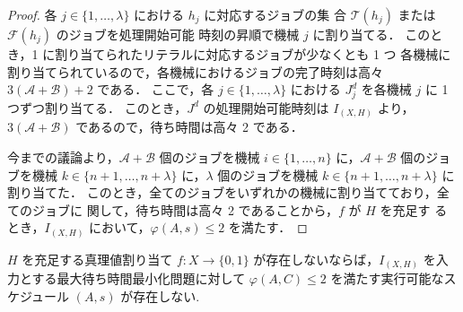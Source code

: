\documentclass[12pt]{optlab-bachelor}
\begin{document}
\begin{proof}
  各 $j \in \{1, \ldots, \lambda \}$ における $h_j$ に対応するジョブの集
  合 $\mathcal{T}(h_j)$ または $\mathcal{F}(h_j)$ のジョブを処理開始可能
  時刻の昇順で機械 $j$ に割り当てる．
  このとき，1 に割り当てられたリテラルに対応するジョブが少なくとも 1 つ
  各機械に割り当てられているので，各機械におけるジョブの完了時刻は高々
  $3(\mathcal{A} + \mathcal{B}) + 2$ である．
  ここで，各 $j \in \{1,\ldots,\lambda\}$ における $J^d_j$ を各機械 $j$
  に 1 つずつ割り当てる．
  このとき，$J^d$ の処理開始可能時刻は $I_{(X,H)}$ より，$3(\mathcal{A}
  + \mathcal{B})$ であるので，待ち時間は高々 2 である．

  今までの議論より，$\mathcal{A} + \mathcal{B}$ 個のジョブを機械 $i \in
  \{1,\ldots,n\}$ に，$\mathcal{A} + \mathcal{B}$ 個のジョブを機械 $k \in\{n + 1, \ldots, n + \lambda\}$ に，$\lambda$ 個のジョブを機械 $k \in\{n + 1, \ldots, n + \lambda\}$ に割り当てた．
  このとき，全てのジョブをいずれかの機械に割り当てており，全てのジョブに
  関して，待ち時間は高々 2 であることから，$f$ が $H$ を充足す
  るとき，$I_{(X,H)}$ において，$\varphi(A,s) \le 2$ を満たす．
\end{proof}

\begin{lemma}\label{l_7}
  $H$ を充足する真理値割り当て $f : X \to \{0,1\}$ が存在しないならば，$I_{(X,H)}$ を入力とする最大待ち時間最小化問題に対して
  $\varphi(A, C) \le 2$ を満たす実行可能なス
  ケジュール $(A,s)$ が存在しない.
\end{lemma}
\end{document}
